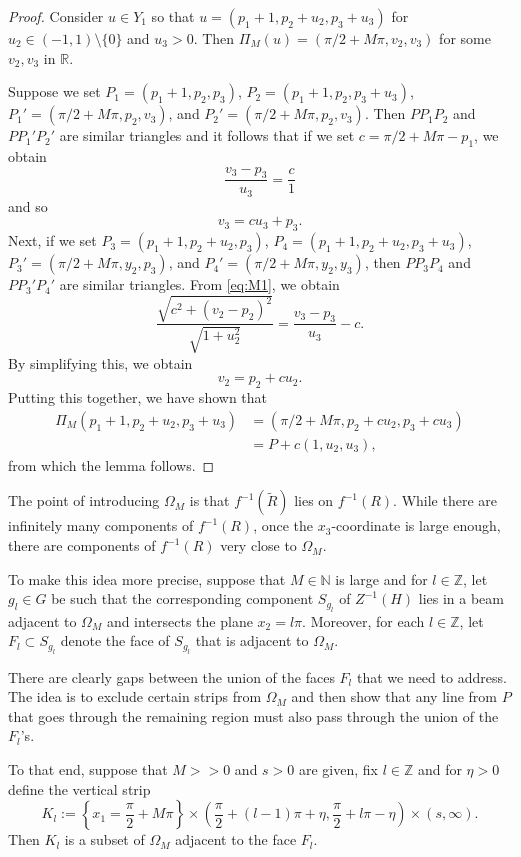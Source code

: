 \documentclass[11pt]{amsart}
\numberwithin{equation}{section}
\theoremstyle{definition}
\theoremstyle{definition}
\theoremstyle{definition}
\newcommand{\Z}{\mathbb{Z}}
\newcommand{\R}{\mathbb{R}}
\newcommand{\N}{\mathbb{N}}
\begin{document}
\begin{proof}
Consider $u \in Y_1$ so that $u = (p_1+1 , p_2 + u_2 , p_3 + u_3)$ for $u_2\in (-1,1)\setminus \{ 0 \}$ and $u_3 > 0$. Then $\Pi_M(u) = (\pi/2 + M\pi , v_2,v_3)$ for some $v_2,v_3$ in $\R$.

Suppose we set $P_1 = (p_1+1,p_2, p_3)$, $P_2 = (p_1+1,p_2,p_3+u_3)$, $P_1' = (\pi/2+M\pi,p_2,v_3)$, and $P_2' = (\pi/2+M\pi, p_2,v_3)$. Then $PP_1P_2$ and $PP_1'P_2'$ are similar triangles and it follows that if we set $c = \pi/2+M\pi - p_1$, we obtain
\begin{equation} 
\label{eq:M1}
\frac{v_3-p_3}{u_3} = \frac{c}{1}
\end{equation}
and so
\[ v_3 = cu_3 + p_3.\]
Next, if we set $P_3 = (p_1+1,p_2+u_2,p_3)$, $P_4 = (p_1+1,p_2+u_2,p_3+u_3)$, $P_3' = (\pi/2+M\pi, y_2,p_3)$, and $P_4' = (\pi/2+M\pi, y_2,y_3)$, then $PP_3P_4$ and $PP_3'P_4'$ are similar triangles. From \eqref{eq:M1}, we obtain
\[ \frac{ \sqrt{c^2 + (v_2-p_2)^2 } }{\sqrt{1+u_2^2}} = \frac{v_3 - p_3}{u_3} - c.\]
By simplifying this, we obtain
\[ v_2 = p_2 + cu_2.\]
Putting this together, we have shown that
\begin{align*} 
\Pi_M ( p_1+1 , p_2 + u_2 , p_3 + u_3) &= (\pi/2 + M \pi , p_2 + cu_2 , p_3 + cu_3)\\
&= P + c(1,u_2,u_3),
\end{align*}
from which the lemma follows.    
\end{proof}

The point of introducing $\Omega_M$ is that $f^{-1}(\widetilde{R})$ lies on $f^{-1}(R)$. While there are infinitely many components of $f^{-1}(R)$, once the $x_3$-coordinate is large enough, there are components of $f^{-1}(R)$ very close to $\Omega_M$.


To make this idea more precise, suppose that $M\in \N$ is large and for $l \in \mathbb{Z}$, let $g_l \in G$ be such that the corresponding component $S_{g_l}$ of $Z^{-1}(H)$ lies in a beam adjacent to $\Omega_M$ and intersects the plane $x_2 = l\pi$.  
Moreover, for each $l \in \mathbb{Z}$, let $F_l \subset S_{g_l}$ denote the face of $S_{g_l}$ that is adjacent to $\Omega_M$. 

There are clearly gaps between the union of the faces $F_l$ that we need to address. The idea is to exclude certain strips from $\Omega_M$ and then show that any line from $P$ that goes through the remaining region must also pass through the union of the $F_l$'s.

To that end, suppose that $M>>0$ and $s>0$ are given, fix $l\in \Z$ and for $\eta >0$ define the vertical strip
\begin{equation}
    \label{eq:Kl}
K_l := \left \{ x_1 = \frac{\pi}{2} + M\pi \right \} \times \left ( \frac{\pi}{2} + (l-1)\pi + \eta, \frac{\pi}{2} + l\pi - \eta \right ) \times (s,\infty).
\end{equation}
Then $K_l$ is a subset of $\Omega_M$ adjacent to the face $F_l$.
\end{document}
